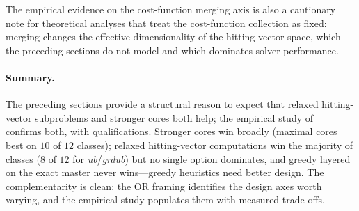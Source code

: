 The empirical evidence on the cost-function merging axis is also a
cautionary note for theoretical analyses that treat the cost-function
collection as fixed: merging changes the effective dimensionality of the
hitting-vector space, which the preceding sections do not model and which
dominates solver performance.

\paragraph{Summary.} The preceding sections provide a structural reason to
expect that relaxed hitting-vector subproblems and stronger cores both help;
the empirical study of~\citet{petrova2025empirical} confirms both, with
qualifications. Stronger cores win broadly (maximal cores best on $10$ of
$12$ classes); relaxed hitting-vector computations win the majority of
classes ($8$ of $12$ for \emph{ub}/\emph{grdub}) but no single option
dominates, and greedy layered on the exact master never wins---greedy
heuristics need better design. The complementarity is clean: the OR framing
identifies the design axes worth varying, and the empirical study populates
them with measured trade-offs.
